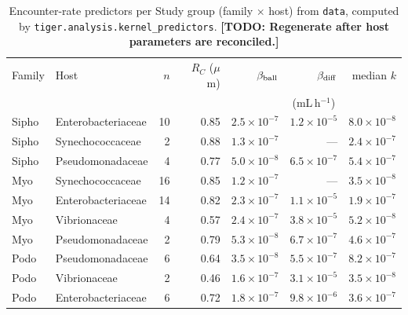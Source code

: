 \documentclass[12pt]{article}
\newcommand{\todo}[1]{{\color{blue}\textbf{[TODO: #1]}}}
\begin{document}
\begin{table}[!ht]
\centering
\caption{Encounter-rate predictors per Study group (family $\times$ host) from \texttt{data}, computed by \texttt{tiger.analysis.kernel\_predictors}. \todo{Regenerate after host parameters are reconciled.}}
\label{tbl:predictors}
\small
\begin{tabular}{llrrrrr}
\toprule
Family & Host & $n$ & $R_C$ ($\mu$m) & $\beta_{\rm ball}$ & $\beta_{\rm diff}$ & median $k$ \\
 & & & & \multicolumn{3}{c}{(mL\,h$^{-1}$)}\\
\midrule
Sipho & Enterobacteriaceae & 10 & 0.85 & $2.5\times10^{-7}$ & $1.2\times10^{-5}$ & $8.0\times10^{-8}$\\
Sipho & Synechococcaceae & 2 & 0.88 & $1.3\times10^{-7}$ & --- & $2.4\times10^{-7}$\\
Sipho & Pseudomonadaceae & 4 & 0.77 & $5.0\times10^{-8}$ & $6.5\times10^{-7}$ & $5.4\times10^{-7}$\\
Myo & Synechococcaceae & 16 & 0.85 & $1.2\times10^{-7}$ & --- & $3.5\times10^{-8}$\\
Myo & Enterobacteriaceae & 14 & 0.82 & $2.3\times10^{-7}$ & $1.1\times10^{-5}$ & $1.9\times10^{-7}$\\
Myo & Vibrionaceae & 4 & 0.57 & $2.4\times10^{-7}$ & $3.8\times10^{-5}$ & $5.2\times10^{-8}$\\
Myo & Pseudomonadaceae & 2 & 0.79 & $5.3\times10^{-8}$ & $6.7\times10^{-7}$ & $4.6\times10^{-7}$\\
Podo & Pseudomonadaceae & 6 & 0.64 & $3.5\times10^{-8}$ & $5.5\times10^{-7}$ & $8.2\times10^{-7}$\\
Podo & Vibrionaceae & 2 & 0.46 & $1.6\times10^{-7}$ & $3.1\times10^{-5}$ & $3.5\times10^{-8}$\\
Podo & Enterobacteriaceae & 6 & 0.72 & $1.8\times10^{-7}$ & $9.8\times10^{-6}$ & $3.6\times10^{-7}$\\
\bottomrule
\end{tabular}
\end{table}

\clearpage

\end{document}
